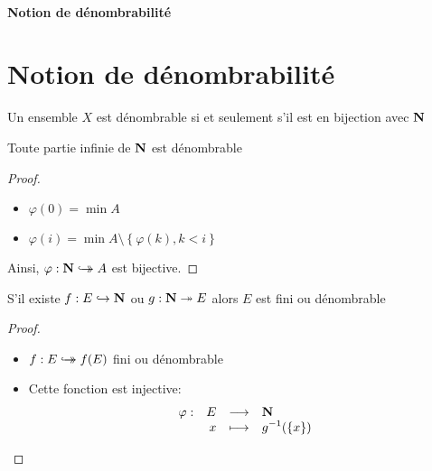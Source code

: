 \ifsolo
    ~

    \vspace{1cm}

    \begin{center}
        \textbf{\LARGE Notion de dénombrabilité} \\[1em]
    \end{center}
    \tableofcontents
\else
    \chapter{Notion de dénombrabilité}

    \minitoc
\fi
\thispagestyle{empty}

\begin{dfn}
    Un ensemble $X$ est dénombrable\footnotemark{}  si et seulement s'il est en bijection avec $\mathbf N$
\end{dfn}


\begin{prop}
Toute partie infinie de $\mathbf N$ est dénombrable
\end{prop}

\begin{proof}
\begin{itemize}
    \item $\varphi(0)=\min A$
    \item  $\varphi(i)=\min A\setminus \left\{ \varphi(k), k<i \right\} $
\end{itemize}
Ainsi, $\varphi: \mathbf N \hookrightarrow\mathrel{\mspace{-15mu}}\rightarrow A$ est bijective.
\end{proof}

\begin{prop}
S'il existe $f: E \hookrightarrow \mathbf N$ ou $g: \mathbf N \twoheadrightarrow E$ alors $E$ est fini ou dénombrable
\end{prop}

\begin{proof}
\begin{itemize}
    \item $f:E \hookrightarrow\mathrel{\mspace{-15mu}}\rightarrow f(E)$ fini ou dénombrable
    \item  Cette fonction est injective: \[
    \begin{array}{rrcl}
        \varphi:& E & \longrightarrow & \mathbf N \\
                & x & \longmapsto & \displaystyle g^{-1}(\left\{  x \right\} )
    \end{array}
    \] 
\end{itemize}
\end{proof}

